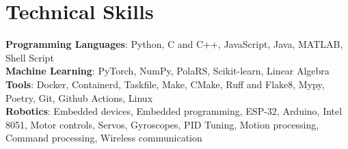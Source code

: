 \section{Technical Skills}

\begin{itemize}[leftmargin=0.15in, label={}]
  \small{\item{
\textbf{Programming Languages}{: %
  Python, %
  C and C++, %
  JavaScript, %
  Java, %
  MATLAB, %
  Shell Script %
}\\
\textbf{Machine Learning}{: %
  PyTorch, %
  NumPy, %
  PolaRS, %
  Scikit-learn, %
  Linear Algebra %
}\\
\textbf{Tools}{: %
  Docker, %
  Containerd, %
  Taskfile, %
  Make, %
  CMake, %
  Ruff and Flake8, %
  Mypy, %
  Poetry, %
  Git, %
  Github Actions, %
  Linux %
}\\
\textbf{Robotics}{: %
  Embedded devices, %
  Embedded programming, %
  ESP-32, %
  Arduino, %
  Intel 8051, %
  Motor controls, %
  Servos, %
  Gyroscopes, %
  PID Tuning, %
  Motion processing, %
  Command processing, %
  Wireless communication %
}
   }}
 \end{itemize}



